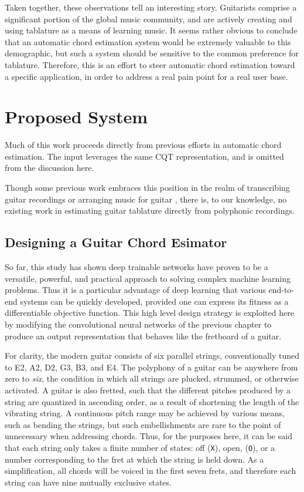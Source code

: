 Taken together, these observations tell an interesting story.
Guitarists comprise a significant portion of the global music community, and are actively creating and using tablature as a means of learning music.
It seems rather obvious to conclude that an automatic chord estimation system would be extremely valuable to this demographic, but such a system should be sensitive to the common preference for tablature.
Therefore, this is an effort to steer automatic chord estimation toward a specific application, in order to address a real pain point for a real user base.


\section{Proposed System}

Much of this work proceeds directly from previous efforts in automatic chord estimation.
The input leverages the same CQT representation, and is omitted from the discussion here.

Though some previous work embraces this position in the realm of transcribing guitar recordings \cite{Barbancho2012} or arranging music for guitar \cite{Hori2013}, there is, to our knowledge, no existing work in estimating guitar tablature directly from polyphonic recordings.


\subsection{Designing a Guitar Chord Esimator}
\label{subsec:design}

So far, this study has shown deep trainable networks have proven to be a versatile, powerful, and practical approach to solving complex machine learning problems.
Thus it is a particular advantage of deep learning that various end-to-end systems can be quickly developed, provided one can express its fitness as a differentiable objective function.
This high level design strategy is exploited here by modifying the convolutional neural networks of the previous chapter to produce an output representation that behaves like the fretboard of a guitar.

For clarity, the modern guitar consists of six parallel strings, conventionally tuned to E2, A2, D2, G3, B3, and E4.
The polyphony of a guitar can be anywhere from zero to \emph{six}, the condition in which all strings are plucked, strummed, or otherwise activated.
A guitar is also fretted, such that the different pitches produced by a string are quantized in ascending order, as a result of shortening the length of the vibrating string.
A continuous pitch range may be achieved by various means, such as bending the strings, but such embellishments are rare to the point of unnecessary when addressing chords.
Thus, for the purposes here, it can be said that each string only takes a finite number of states: off (\texttt{X}), open, (\texttt{O}), or a number corresponding to the fret at which the string is held down.
As a simplification, all chords will be voiced in the first seven frets, and therefore each string can have nine mutually exclusive states.


